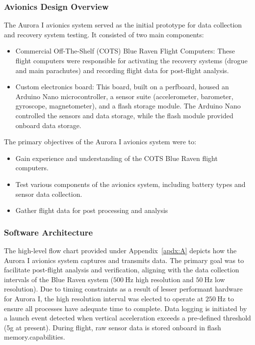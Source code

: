 \subsubsection{Avionics Design Overview}
The Aurora I avionics system served as the initial prototype for data collection and recovery system testing. It consisted of two main components: 
\begin{itemize}
  \item Commercial Off-The-Shelf (COTS) Blue Raven Flight Computers: These flight computers were responsible for activating the recovery systems (drogue and main parachutes) and recording flight data for post-flight analysis. 
  \item Custom electronics board: This board, built on a perfboard, housed an Arduino Nano microcontroller, a sensor suite (accelerometer, barometer, gyroscope, magnetometer), and a flash storage module. The Arduino Nano controlled the sensors and data storage, while the flash module provided onboard data storage. 
\end{itemize}

\noindent The primary objectives of the Aurora I avionics system were to: 
\begin{itemize}
  \item Gain experience and understanding of the COTS Blue Raven flight computers. 
  \item Test various components of the avionics system, including battery types and sensor data collection. 
  \item Gather flight data for post processing and analysis
\end{itemize}

\subsubsection{Software Architecture}
The high-level flow chart provided under Appendix~\ref{apdx:A} depicts how the Aurora I avionics system captures and transmits data. The primary goal was to facilitate post-flight analysis and verification, aligning with the data collection intervals of the Blue Raven system ($\SI{500}{\hertz}$ high resolution and $\SI{50}{\hertz}$ low resolution). Due to timing constraints as a result of lesser performant hardware for Aurora I, the high resolution interval was elected to operate at $\SI{250}{\hertz}$ to ensure all processes have adequate time to complete. Data logging is initiated by a launch event detected when vertical acceleration exceeds a pre-defined threshold (5g at present). During flight, raw sensor data is stored onboard in flash memory.capabilities. 

